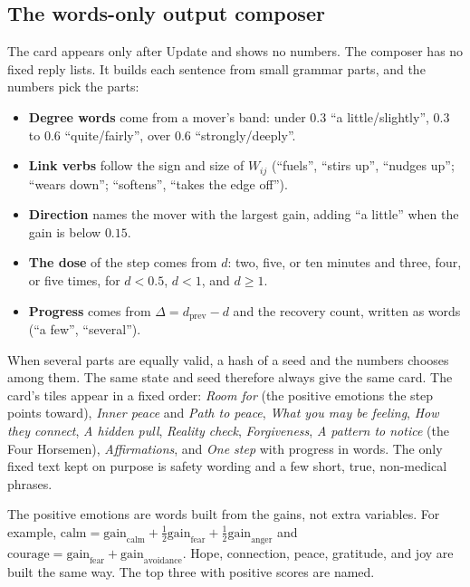 \documentclass[10pt]{article}
\theoremstyle{definition}
\theoremstyle{remark}
\begin{document}
\subsection{The words-only output composer}
\label{sec:composer}
The card appears only after Update and shows no numbers. The composer has no fixed reply lists. It builds each sentence from small grammar parts, and the numbers pick the parts:
\begin{itemize}
\item \textbf{Degree words} come from a mover's band: under $0.3$ ``a little/slightly'', $0.3$ to $0.6$ ``quite/fairly'', over $0.6$ ``strongly/deeply''.
\item \textbf{Link verbs} follow the sign and size of $W_{ij}$ (``fuels'', ``stirs up'', ``nudges up''; ``wears down''; ``softens'', ``takes the edge off'').
\item \textbf{Direction} names the mover with the largest gain, adding ``a little'' when the gain is below $0.15$.
\item \textbf{The dose} of the step comes from $d$: two, five, or ten minutes and three, four, or five times, for $d<0.5$, $d<1$, and $d\ge1$.
\item \textbf{Progress} comes from $\Delta=d_{\mathrm{prev}}-d$ and the recovery count, written as words (``a few'', ``several'').
\end{itemize}
When several parts are equally valid, a hash of a seed and the numbers chooses among them. The same state and seed therefore always give the same card. The card's tiles appear in a fixed order: \emph{Room for} (the positive emotions the step points toward), \emph{Inner peace} and \emph{Path to peace}, \emph{What you may be feeling}, \emph{How they connect}, \emph{A hidden pull}, \emph{Reality check}, \emph{Forgiveness}, \emph{A pattern to notice} (the Four Horsemen), \emph{Affirmations}, and \emph{One step} with progress in words. The only fixed text kept on purpose is safety wording and a few short, true, non-medical phrases.

The positive emotions are words built from the gains, not extra variables. For example, $\text{calm} = \mathrm{gain}_{\text{calm}} + \tfrac12\mathrm{gain}_{\text{fear}} + \tfrac12\mathrm{gain}_{\text{anger}}$ and $\text{courage} = \mathrm{gain}_{\text{fear}} + \mathrm{gain}_{\text{avoidance}}$. Hope, connection, peace, gratitude, and joy are built the same way. The top three with positive scores are named.

\end{document}
